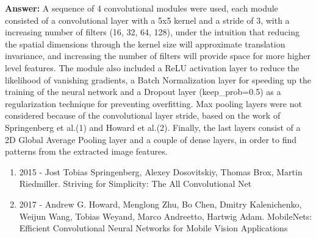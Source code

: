 \documentclass[11pt]{article}
\providecommand{\tightlist}{%
      \setlength{\itemsep}{0pt}\setlength{\parskip}{0pt}}
\begin{document}
\textbf{Answer:} A sequence of 4 convolutional modules were used, each
module consisted of a convolutional layer with a 5x5 kernel and a stride
of 3, with a increasing number of filters (16, 32, 64, 128), under the
intuition that reducing the spatial dimensions through the kernel size
will approximate translation invariance, and increasing the number of
filters will provide space for more higher level features. The module
also included a ReLU activation layer to reduce the likelihood of
vanishing gradients, a Batch Normalization layer for speeding up the
training of the neural network and a Dropout layer (keep\_prob=0.5) as a
regularization technique for preventing overfitting. Max pooling layers
were not considered because of the convolutional layer stride, based on
the work of Springenberg et al.(1) and Howard et al.(2). Finally, the
last layers consist of a 2D Global Average Pooling layer and a couple of
dense layers, in order to find patterns from the extracted image
features.

\begin{enumerate}
\def\labelenumi{\arabic{enumi}.}
\tightlist
\item
  2015 - Jost Tobias Springenberg, Alexey Dosovitskiy, Thomas Brox,
  Martin Riedmiller. Striving for Simplicity: The All Convolutional Net
\item
  2017 - Andrew G. Howard, Menglong Zhu, Bo Chen, Dmitry Kalenichenko,
  Weijun Wang, Tobias Weyand, Marco Andreetto, Hartwig Adam. MobileNets:
  Efficient Convolutional Neural Networks for Mobile Vision Applications
\end{enumerate}
\end{document}
